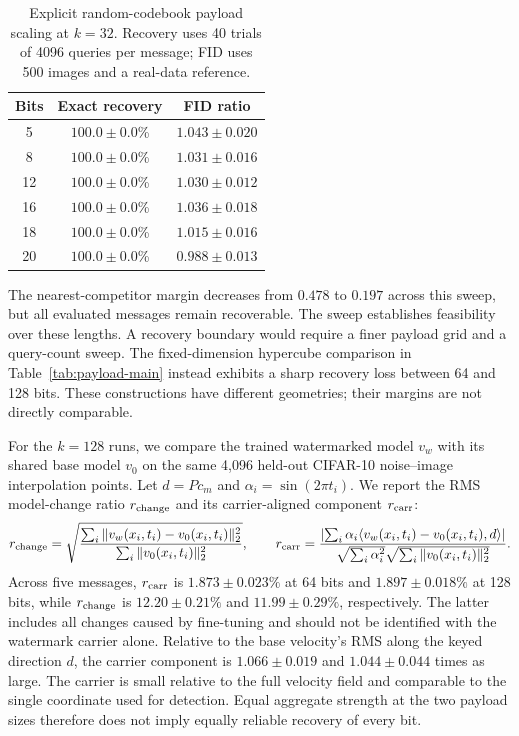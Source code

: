\documentclass[11pt]{article}
\begin{document}
\begin{table}[t]
\centering
\caption{Explicit random-codebook payload scaling at $k=32$.
Recovery uses 40 trials of 4096 queries per message; FID uses 500 images
and a real-data reference.}
\label{tab:app-capacity}
\small
\begin{tabular}{ccc}
\toprule
Bits & Exact recovery & FID ratio \\
\midrule
5 & $100.0{\pm}0.0$\% & $1.043{\pm}0.020$ \\
8 & $100.0{\pm}0.0$\% & $1.031{\pm}0.016$ \\
12 & $100.0{\pm}0.0$\% & $1.030{\pm}0.012$ \\
16 & $100.0{\pm}0.0$\% & $1.036{\pm}0.018$ \\
18 & $100.0{\pm}0.0$\% & $1.015{\pm}0.016$ \\
20 & $100.0{\pm}0.0$\% & $0.988{\pm}0.013$ \\
\bottomrule
\end{tabular}
\end{table}

The nearest-competitor margin decreases from $0.478$ to $0.197$ across
this sweep, but all evaluated messages remain recoverable. The sweep establishes feasibility over these lengths. A recovery
boundary would require a finer payload grid and a query-count sweep. The fixed-dimension hypercube comparison in
Table~\ref{tab:payload-main} instead exhibits a sharp recovery loss
between 64 and 128 bits. These constructions have different geometries;
their margins are not directly comparable.

For the $k=128$ runs, we compare the trained watermarked model $v_w$
with its shared base model $v_0$ on the same 4,096 held-out CIFAR-10
noise--image interpolation points. Let $d=P c_m$ and
$\alpha_i=\sin(2\pi t_i)$. We report the RMS model-change ratio
$r_{\rm change}$ and its carrier-aligned component $r_{\rm carr}$:
\begin{equation}
r_{\rm change}=
\sqrt{\frac{\sum_i\|v_w(x_i,t_i)-v_0(x_i,t_i)\|_2^2}
{\sum_i\|v_0(x_i,t_i)\|_2^2}},\qquad
r_{\rm carr}=
\frac{\left|\sum_i\alpha_i\langle v_w(x_i,t_i)-v_0(x_i,t_i),d\rangle\right|}
{\sqrt{\sum_i\alpha_i^2}\sqrt{\sum_i\|v_0(x_i,t_i)\|_2^2}}.
\end{equation}
Across five messages, $r_{\rm carr}$ is $1.873\pm0.023\%$ at 64 bits
and $1.897\pm0.018\%$ at 128 bits, while $r_{\rm change}$ is
$12.20\pm0.21\%$ and $11.99\pm0.29\%$, respectively. The latter
includes all changes caused by fine-tuning and should not be identified
with the watermark carrier alone. Relative to the base velocity's
RMS along the keyed direction $d$, the carrier component is
$1.066\pm0.019$ and $1.044\pm0.044$ times as large. The carrier is small relative to the full velocity field and comparable
to the single coordinate used for detection. Equal aggregate strength
at the two payload sizes therefore does not imply equally reliable
recovery of every bit.
\end{document}
